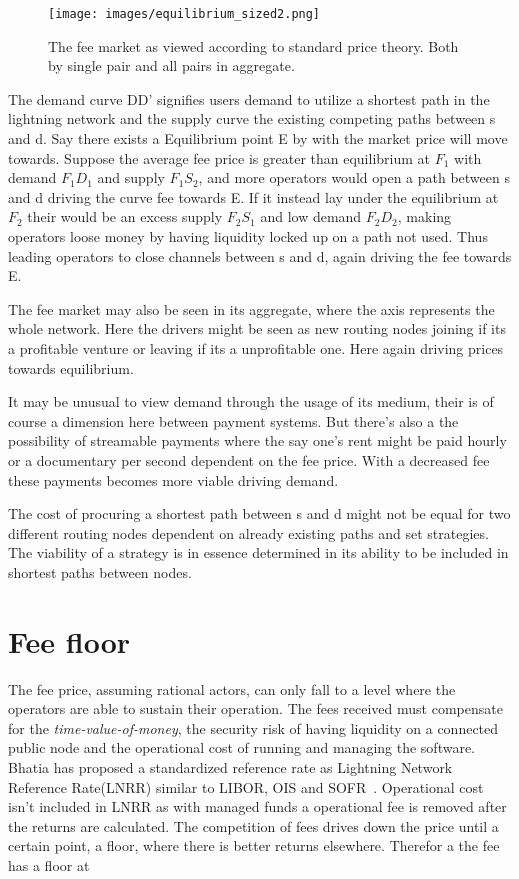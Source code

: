 \begin{figure}[!htb]
	\hspace*{-0.3cm} 
	\centering
	\texttt{[image: images/equilibrium\_sized2.png]}
	\caption{ The fee market as viewed according to standard price theory. Both by single pair and all pairs in aggregate. 
		}
		\label{fig:equilibrium}
		\hspace*{2mm} 	
\end{figure}

The demand curve DD' signifies users demand to utilize a shortest path in the lightning network and the supply curve the existing competing paths between s and d. Say there exists a Equilibrium point E by with the market price will move towards. Suppose the average fee price is greater than equilibrium at $F_{1}$ with demand $F_{1}D_{1}$ and supply $F_{1}S_{2}$, and more operators would open a path between s and d driving the curve fee towards E. If it instead lay under the equilibrium at $F_2$ their would be an excess supply $F_{2}S_{1}$ and low demand $F_{2}D_{2}$, making operators loose money by having liquidity locked up on a path not used. Thus leading operators to close channels between s and d, again driving the fee towards E.

The fee market may also be seen in its aggregate, where the axis represents the whole network. Here the drivers might be seen as new routing nodes joining if its a profitable venture or leaving if its a unprofitable one. Here again driving prices towards equilibrium. 

It may be unusual to view demand through the usage of its medium, their is of course a dimension here between payment systems. But there's also a the possibility of streamable payments where the say one's rent might be paid hourly or a documentary per second dependent on the fee price. With a decreased fee these payments becomes more viable driving demand.

The cost of procuring a shortest path between s and d might not be equal for two different routing nodes dependent on already existing paths and set strategies. The viability of a strategy is in essence determined in its ability to be included in shortest paths between nodes.

\section{Fee floor}

The fee price, assuming rational actors, can only fall to a level where the operators are able to sustain their operation. The fees received must compensate for the \textit{time-value-of-money}, the security risk of having liquidity on a connected public node and the operational cost of running and managing the software. Bhatia has proposed a standardized reference rate as Lightning Network Reference Rate(LNRR) similar to LIBOR, OIS and SOFR~\cite{bhatia:time:value}. Operational cost isn't included in LNRR as with managed funds a  operational fee is removed after the returns are calculated. The competition of fees drives down the price until a certain point, a floor, where there is better returns elsewhere. Therefor a the fee has a floor at

